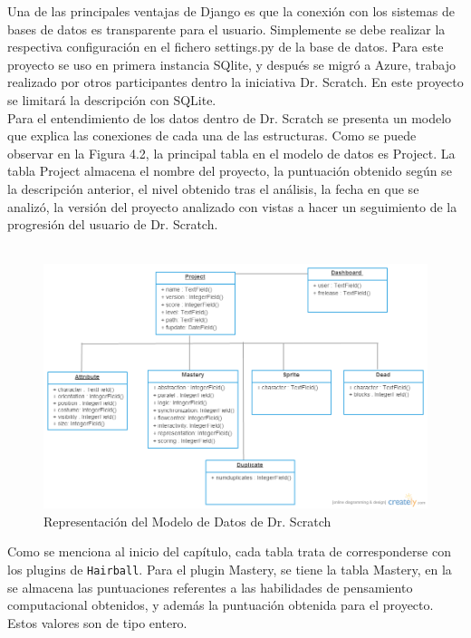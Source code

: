 \documentclass[a4paper, 12pt]{book}
\begin{document}
Una de las principales ventajas de Django es que la conexión con los sistemas de bases
de datos es transparente para el usuario. Simplemente se debe realizar la respectiva 
configuración en el fichero settings.py de la base de datos. Para este proyecto se uso
en primera instancia SQlite, y después se migró a Azure, trabajo realizado por otros 
participantes dentro la iniciativa Dr. Scratch. En este proyecto se limitará la 
descripción con SQLite. \\  
 
Para el entendimiento de los datos dentro de Dr. Scratch se presenta un modelo que 
explica las conexiones de cada una de las estructuras. Como se puede observar en la 
Figura 4.2, la principal tabla en el modelo de datos es Project. La tabla Project 
almacena el nombre del proyecto, la puntuación obtenido según se la descripción 
anterior, el nivel obtenido tras el análisis, la fecha en que se analizó, la versión 
del proyecto analizado con vistas a hacer un seguimiento de la progresión del 
usuario de Dr. Scratch. \\ \\

 \begin{figure}[h]
		\graphicspath{{img/}}
    \includegraphics[bb=0 0 800 600, width=14cm, keepaspectratio]{modelo.png}
    \caption{Representación del Modelo de Datos de Dr. Scratch}
    \label{figura:foro_hilos}
 \end{figure}



Como se menciona al inicio del capítulo, cada tabla trata de corresponderse con los
plugins de \texttt{Hairball}. Para el plugin Mastery, se tiene la tabla Mastery, en
la se almacena las puntuaciones referentes a las habilidades de pensamiento 
computacional obtenidos, y además la puntuación obtenida para el proyecto. Estos 
valores son de tipo entero. \\ 
\end{document}
